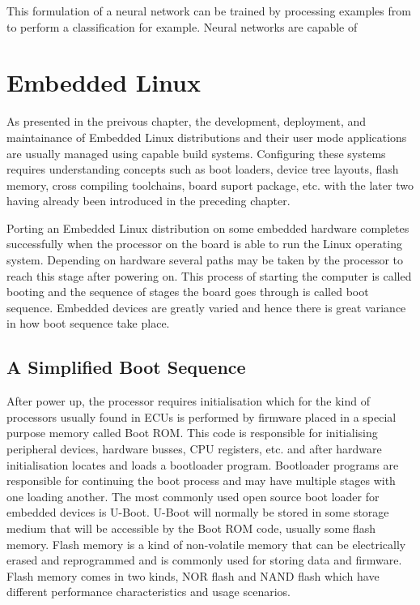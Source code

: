This formulation of a neural network can be trained by processing examples from to perform a classification for example. Neural networks are capable of

\section{Embedded Linux}

As presented in the preivous chapter, the development, deployment, and maintainance of Embedded Linux distributions and their user mode applications are usually managed using capable build systems. Configuring these systems requires understanding concepts such as boot loaders, device tree layouts, flash memory, cross compiling toolchains, board suport package, etc. with the later two having already been introduced in the preceding chapter.

Porting an Embedded Linux distribution on some embedded hardware completes successfully when the processor on the board is able to run the Linux operating system. Depending on hardware several paths may be taken by the processor to reach this stage after powering on. This process of starting the computer is called booting and the sequence of stages the board goes through is called boot sequence. Embedded devices are greatly varied and hence there is great variance in how boot sequence take place.

\subsection{A Simplified Boot Sequence}

After power up, the processor requires initialisation which for the kind of processors usually found in ECUs is performed by firmware placed in a special purpose memory called Boot ROM. This code is responsible for initialising peripheral devices, hardware busses, CPU registers, etc. and after hardware initialisation locates and loads a bootloader program. Bootloader programs are responsible for continuing the boot process and may have multiple stages with one loading another. The most commonly used open source boot loader for embedded devices is U-Boot. U-Boot will normally be stored in some storage medium that will be accessible by the Boot ROM code, usually some flash memory. Flash memory is a kind of non-volatile memory that can be electrically erased and reprogrammed and is commonly used for storing data and firmware. Flash memory comes in two kinds, NOR flash and NAND flash which have different performance characteristics and usage scenarios.

